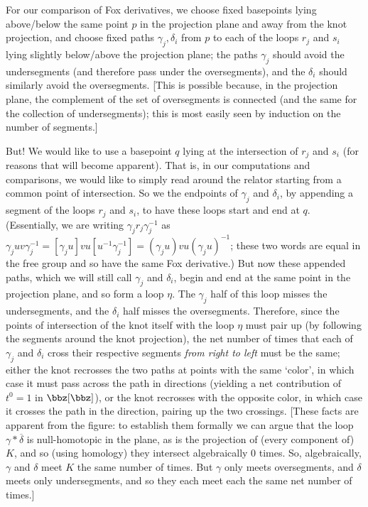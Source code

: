 \ssk

For our comparison of Fox derivatives, we choose fixed basepoints lying above/below 
the same point $p$ in the projection plane and away from the knot projection, and choose
fixed paths $\gamma_j,\delta_i$ from $p$ to each of the loops $r_j$ and $s_i$ lying slightly
below/above the projection plane; the paths
$\gamma_j$ should avoid the undersegments (and therefore pass under the oversegments),
and the $\delta_i$ should similarly avoid the oversegments. [This is possible because,
in the projection plane, the complement of the set of oversegments is connected (and the
same for the collection of undersegments); this is most easily seen by induction on the 
number of segments.]

\vskip-10pt

\leavevmode

\epsfxsize=4in

\msk

But! We  would like to use a basepoint $q$ lying at the intersection of
$r_j$ and $s_i$ (for reasons that will become apparent). That is, in our computations
and comparisons,
we would like to simply read around the relator starting from a common point
of intersection. So we  the endpoints of $\gamma_j$ and $\delta_i$, by
appending a segment of the loops $r_j$ and $s_i$, to have these loops start and end at $q$.
(Essentially, we are writing $\gamma_jr_j\gamma_j^{-1}$ as 
$\gamma_juv\gamma_j^{-1}=[\gamma_ju]vu[u^{-1}\gamma_j^{-1}]=(\gamma_ju)vu(\gamma_ju)^{-1}$;
these two words are equal in the free group and so have the same Fox derivative.)
But now these appended paths, which we will still call $\gamma_j$ and $\delta_i$,
begin and end at the same point in the projection plane, and so form a
loop $\eta$. The $\gamma_j$ half of this loop misses the undersegments, and the $\delta_i$
half misses the oversegments. Therefore, since the points of intersection
of the knot itself with the loop $\eta$ must pair up (by following the segments around the
knot projection), the net number of times that each of $\gamma_j$ and $\delta_i$
cross their respective segments {\it from right to left} must be the same; either
the knot recrosses the two paths at points with the same `color', in which 
case it must pass across 
the  path in 
directions (yielding a net contribution of $t^0=1$ in $\bbz[\bbz]$), 
or the knot recrosses with the opposite color, in which case
it crosses the  path in the  direction, pairing up the two crossings.
[These facts are apparent from the figure: to establish them formally we can argue that
the loop $\gamma*\overline{\delta}$ is null-homotopic in the 
plane, as is the projection of (every component of) $K$, and so 
(using homology) they intersect algebraically
$0$ times. So, algebraically, $\gamma$ and $\delta$ meet $K$ the
same number of times. But $\gamma$ only meets oversegments, and $\delta$ meets only 
undersegments, and so they each meet each the same net number of times.]

